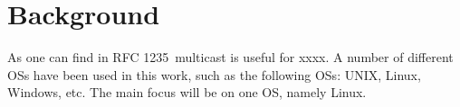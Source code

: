 


\section{Background}
\label{sec:background}


As one can find in RFC 1235\,\cite{ioannidis_coherent_1991} multicast is useful for xxxx. A number of different \glspl{OS} have been used in this work, such as the following \glspl{OS}: UNIX, Linux, Windows, etc. The main focus will be on one \gls{OS}, namely Linux.

